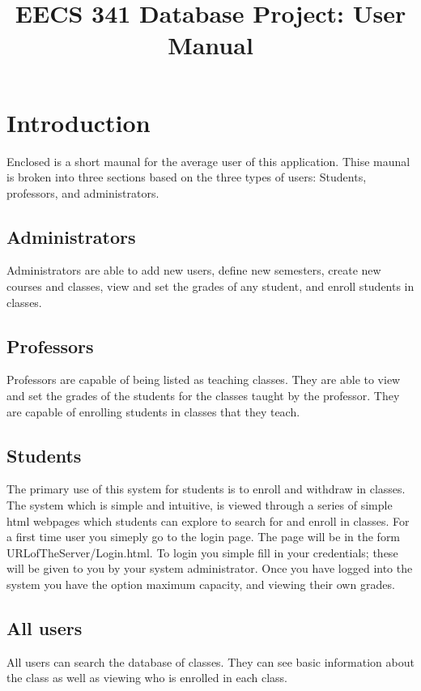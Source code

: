 \documentclass[11pt,oneside,a4paper]{article}
\title{EECS 341 Database Project: User Manual}
\begin{document}
\maketitle
\section{Introduction}
Enclosed is a short maunal for the average user of this application.  
Thise maunal is broken into three sections based on the three types of 
users: Students, professors, and administrators.
\subsection{Administrators}
Administrators are able to add new users, define new semesters, create new
courses and classes, view and set the grades of any student, and enroll students in
classes.
\subsection{Professors}
Professors are capable of being listed as teaching classes. They are able to
view and set the grades of the students for the classes taught by the
professor. They are capable of enrolling students in classes that they teach.
\subsection{Students}
\subsub
The primary use of this system for students is to enroll and withdraw in classes.  The system which is simple and intuitive, is viewed through a series of simple html webpages which students can explore to search for and enroll in classes.  For a first time user you simeply go to the login page.  The page will be in the form URLofTheServer/Login.html.  To login you simple fill in your credentials; these will be given to you by your system administrator.  Once you have logged into the system you have the option   
maximum capacity, and viewing their own grades.
\subsection{All users}
All users can search the database of classes. They can see basic information
about the class as well as viewing who is enrolled in each class.
\end{document}
